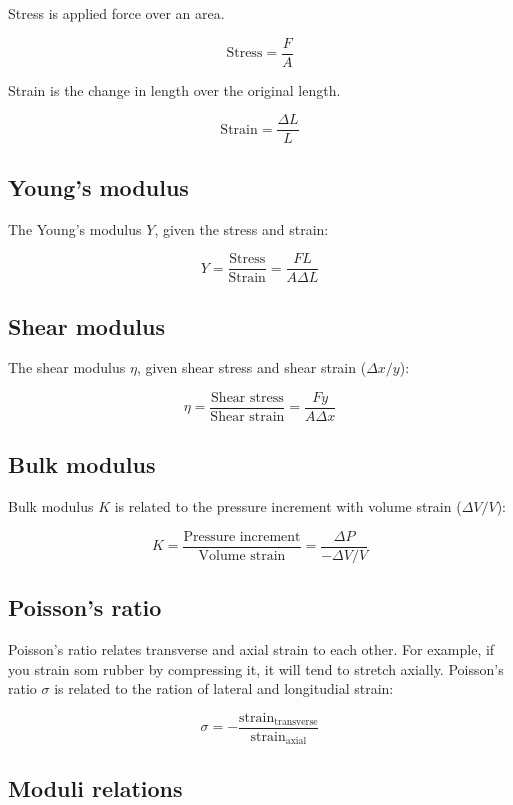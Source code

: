 \documentclass[12pt]{article}
\begin{document}
Stress is applied force over an area.

\[
\boxed{
\text{Stress} = \frac{F}{A}
}
\]

Strain is the change in length over the original length.

\[
\boxed{
\text{Strain} = \frac{\Delta L}{L}
}
\]

\subsection{Young's modulus}

The Young's modulus $Y$, given the stress and strain:

\[
\boxed{
Y = \frac{\text{Stress}}{\text{Strain}} = \frac{FL}{A \Delta L}
}
\]

\subsection{Shear modulus}

The shear modulus $\eta$, given shear stress and shear strain ($\Delta x/y$):

\[
\boxed{
\eta = \frac{\text{Shear stress}}{\text{Shear strain}} = \frac{F y}{A \Delta x}
}
\]

\subsection{Bulk modulus}

Bulk modulus $K$ is related to the pressure increment with volume strain ($\Delta V/V$):

\[
\boxed{
K = \frac{\text{Pressure increment}}{\text{Volume strain}} = \frac{\Delta P}{- \Delta V/V}
}
\]

\subsection{Poisson's ratio}

Poisson's ratio relates transverse and axial strain to each other.
For example, if you strain som rubber by compressing it, it will tend to stretch axially.
Poisson's ratio $\sigma$ is related to the ration of lateral and longitudial strain:

\[
\boxed{
\sigma = -\frac{\text{strain}_{\text{transverse}}}{\text{strain}_{\text{axial}}}
}
\]

\newpage

\subsection{Moduli relations}
\end{document}
